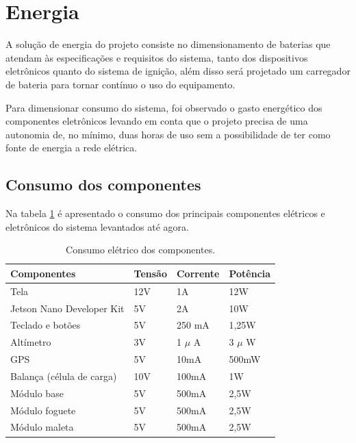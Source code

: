 \section{Energia}

A solução de energia do projeto consiste no dimensionamento de baterias que atendam às especificações e requisitos do sistema, tanto dos dispositivos eletrônicos quanto do sistema de ignição, além disso será projetado um carregador de bateria para tornar contínuo o uso do equipamento.

Para dimensionar consumo do sistema, foi observado o gasto energético dos componentes eletrônicos levando em conta que o projeto precisa de uma autonomia de, no mínimo, duas horas de uso sem a possibilidade de ter como fonte de energia a rede elétrica.

\subsection{Consumo dos componentes}

Na tabela \ref{tab:consumo} é apresentado o consumo dos principais componentes elétricos e eletrônicos do sistema levantados até agora.

\begin{center}
\begin{table}[H]
\centering
\begin{tabular}{ |m{5cm}|m{3cm}|m{3cm}|m{3cm}| } 
\hline
\textbf{ Componentes }&\textbf{ Tensão} & \textbf{Corrente }& Potência \\ 
 \hline
 Tela & 12V & 1A & 12W \\
  \hline
Jetson Nano Developer Kit & 5V & 2A & 10W \\
  \hline
 Teclado e botões & 5V & 250 mA & 1,25W \\ 
  \hline
 Altímetro & 3V & 1 $\mu$ A & 3 $\mu$ W \\ 
 \hline
 GPS & 5V & 10mA & 500mW \\
 \hline
 Balança (célula de carga) & 10V & 100mA & 1W \\ 
 \hline
 Módulo base & 5V & 500mA & 2,5W \\ 
 \hline
 Módulo foguete & 5V & 500mA & 2,5W \\  
 \hline
 Módulo maleta & 5V & 500mA & 2,5W \\ 
 \hline
\end{tabular}
\caption{Consumo elétrico dos componentes.}
\label{tab:consumo}
\end{table}
\end{center}


